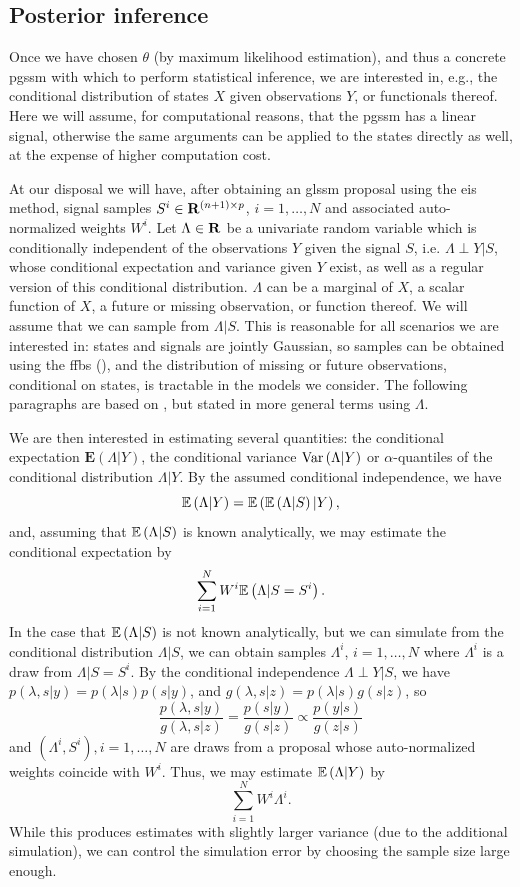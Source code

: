 \subsection{Posterior inference}
\label{subsec:inference}
Once we have chosen $\theta$ (by maximum likelihood estimation), and thus a concrete \gls{pgssm} with which to perform statistical inference, we are interested in, e.g., the conditional distribution of states $X$ given observations $Y$, or functionals thereof. 
Here we will assume, for computational reasons, that the \gls{pgssm} has a linear signal, otherwise the same arguments can be applied to the states directly as well, at the expense of higher computation cost.

At our disposal we will have, after obtaining an \gls{glssm} proposal using the \gls{eis} method, signal samples $S^{i}\in \mathbf R^{(n+1)\times p}$, $i = 1, \dots, N$ and associated auto-normalized weights $W^{i}$. 
Let $\Lambda \in \mathbf R$ be a univariate random variable which is conditionally independent of the observations $Y$ given the signal $S$, i.e. $\Lambda \perp Y | S$, whose conditional expectation and variance given $Y$ exist, as well as a regular version of this conditional distribution. $\Lambda$ can be a marginal of $X$, a scalar function of $X$, a future or missing observation, or function thereof. We will assume that we can sample from $\Lambda | S$. This is reasonable for all scenarios we are interested in: states and signals are jointly Gaussian, so samples can be obtained using the \gls{ffbs} (), and the distribution of missing or future observations, conditional on states, is tractable in the models we consider. The following paragraphs are based on \citep[Section 11.5]{Durbin2012Time}, but stated in more general terms using $\Lambda$. 

We are then interested in estimating several quantities: the conditional expectation $\mathbf E \left( \Lambda | Y \right)$, the conditional variance $\operatorname{Var} \left( \Lambda | Y \right)$ or $\alpha$-quantiles of the conditional distribution $\Lambda | Y$. By the assumed conditional independence, we have
$$
    \mathbb E \left( \Lambda | Y\right) = \mathbb E \left( \mathbb E \left( \Lambda | S \right) | Y \right),
$$
and, assuming that $\mathbb E \left( \Lambda | S \right)$ is known analytically, we may estimate the conditional expectation by
$$
\sum_{i = 1}^N W^{i} \mathbb E \left( \Lambda | S = S^{i} \right).
$$
In the case that $\mathbb E \left( \Lambda | S \right)$ is not known analytically, but we can simulate from the conditional distribution $\Lambda | S$, we can obtain samples $\Lambda^{i}$, $i = 1, \dots, N$ where $\Lambda^{i}$ is a draw from $\Lambda| S = S^{i}$. By the conditional independence $\Lambda \perp Y | S$, we have $p(\lambda, s | y) = p(\lambda | s) p(s | y)$, and $g(\lambda, s | z) = p(\lambda | s)g(s|z)$, so 
$$
    \frac{p(\lambda, s|y)}{g(\lambda, s | z)} = \frac{p(s | y)}{g(s|z)} \propto \frac{p(y|s)}{g(z|s)}
$$
and $(\Lambda^{i}, S^{i}), i = 1,\dots, N$ are draws from a proposal whose auto-normalized weights coincide with $W^{i}$. Thus, we may estimate $\mathbb E \left( \Lambda | Y \right)$ by
$$
    \sum_{i = 1}^N W^{i} \Lambda^{i}.
$$
While this produces estimates with slightly larger variance (due to the additional simulation), we can control the simulation error by choosing the sample size large enough.

